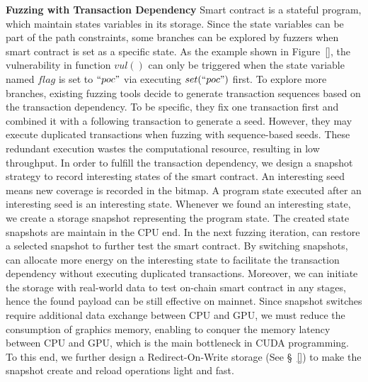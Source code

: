 \noindent \textbf{Fuzzing with Transaction Dependency}
Smart contract is a stateful program, which maintain states variables in its storage. Since the state variables can be part of the path constraints, some branches can be explored by fuzzers when smart contract is set as a specific state. 
%
As the example shown in Figure~\ref{}, the vulnerability in function $vul()$ can only be triggered when the state variable named $flag$ is set to $``poc"$ via executing $set(``poc")$ first. 
%
To explore more branches, existing fuzzing tools decide to generate transaction sequences based on the transaction dependency\cite{confuzzie, echidna}. 
To be specific, they fix one transaction first and combined it with a following transaction to generate a seed. However, they may execute duplicated transactions when fuzzing with sequence-based seeds. These redundant execution wastes the computational resource, resulting in low throughput. 
%
%
In order to fulfill the transaction dependency, we design a snapshot strategy to record interesting states of the smart contract. An interesting seed means new coverage is recorded in the bitmap. A program state executed after an interesting seed is an interesting state. 
Whenever we found an interesting state, we create a storage snapshot representing the program state. 
The created state snapshots are maintain in the CPU end. 
In the next fuzzing iteration, {\tool} can restore a selected snapshot to further test the smart contract.
By switching snapshots, {\tool} can allocate more energy on the interesting state to facilitate the transaction dependency without executing duplicated transactions. Moreover, we can initiate the storage with real-world data to test on-chain smart contract in any stages, hence the found payload can be still effective on mainnet. 
%
Since snapshot switches require additional data exchange between CPU and GPU, we must reduce the consumption of graphics memory, enabling {\tool} to conquer the memory latency between CPU and GPU, which is the main bottleneck in CUDA programming. 
To this end, we further design a Redirect-On-Write storage (See \S~\ref{}) to make the snapshot create and reload operations light and fast.


